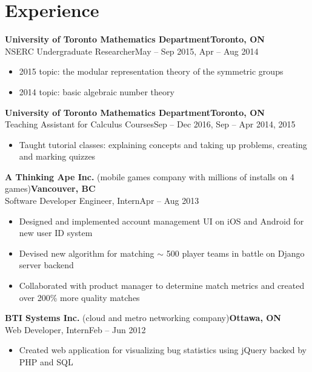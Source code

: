 \documentclass[10pt,letterpaper]{article}
\newcommand*\textmb[1]{\fontseries{b}\selectfont#1\fontseries{m}\selectfont}
\newcommand*\company[1]{\textbf{#1}}
\newcommand*\position[1]{\textmb{#1}}
\newcommand*\location\company
\newcommand*\timespan\position
\begin{document}
\section*{Experience}
\company{University of Toronto Mathematics Department}\hfill\location{Toronto, ON}\\
\position{NSERC Undergraduate Researcher}\hfill\timespan{May -- Sep 2015, Apr -- Aug 2014}
\begin{itemize}
\item 2015 topic: the modular representation theory of the symmetric groups
\item 2014 topic: basic algebraic number theory
\end{itemize}
\company{University of Toronto Mathematics Department}\hfill\location{Toronto, ON}\\
\position{Teaching Assistant for Calculus Courses}\hfill\timespan{Sep -- Dec 2016, Sep -- Apr 2014, 2015}
\begin{itemize}
\item Taught tutorial classes: explaining concepts and taking up problems, creating and marking quizzes
\end{itemize}
\company{A Thinking Ape Inc.} (mobile games company with millions of installs on 4 games)\hfill\location{Vancouver, BC}\\
\position{Software Developer Engineer, Intern}\hfill\timespan{Apr -- Aug 2013}
\begin{itemize}
\item Designed and implemented account management UI on iOS and Android for new user ID system
\item Devised new algorithm for matching \(\sim\) 500 player teams in battle on Django server backend
\item Collaborated with product manager to determine match metrics and created over 200\% more quality matches
\end{itemize}
\company{BTI Systems Inc.} (cloud and metro networking company)\hfill\location{Ottawa, ON}\\
\position{Web Developer, Intern}\hfill\timespan{Feb -- Jun 2012}
\begin{itemize}
\item Created web application for visualizing bug statistics using jQuery backed by PHP and SQL
\end{itemize}
\end{document}
